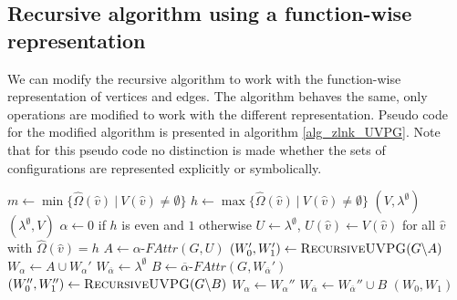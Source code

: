 \subsection{Recursive algorithm using a function-wise representation}
We can modify the recursive algorithm to work with the function-wise representation of vertices and edges. The algorithm behaves the same, only operations are modified to work with the different representation.  Pseudo code for the modified algorithm is presented in algorithm \ref{alg_zlnk_UVPG}. Note that for this pseudo code no distinction is made whether the sets of configurations are represented explicitly or symbolically.
\begin{algorithm}
	\caption{$\textsc{RecursiveUVPG}(\textit{PG } G = (\\
		V : \hat{V} \rightarrow 2^\mathfrak{C},\\
		\hat{V}_0 \subseteq \hat{V},\\
		\hat{V}_1 \subseteq \hat{V},\\
		E : \hat{E} \rightarrow 2^\mathfrak{C},\\
		\hat{\Omega} : \hat{V}\rightarrow \mathbb{N}))$}\label{alg_zlnk_UVPG}
	\begin{algorithmic}[1]
		\State $m \gets \min\{ \hat{\Omega}(\hat{v})\ |\ V(\hat{v}) \neq \emptyset \}$
		\State $h \gets \max\{ \hat{\Omega}(\hat{v})\ |\ V(\hat{v}) \neq \emptyset \}$
		\State \Return $(V,\lambda^\emptyset)$
		\Else
		\State \Return $(\lambda^\emptyset, V)$
		\EndIf
		\EndIf
		\State $\alpha \gets 0$ if $h$ is even and $1$ otherwise
		\State $U \gets \lambda^\emptyset$, $U(\hat{v}) \gets V(\hat{v})$ for all $\hat{v}$ with $\hat{\Omega}(\hat{v}) = h$
		\State $A \gets \alpha\textit{-FAttr}(G, U)$
		\State $(W_0', W_1') \gets \textsc{RecursiveUVPG}(G \backslash A)$
		\State $W_\alpha \gets A \cup W_\alpha'$
		\State $W_{\overline{\alpha}} \gets \lambda^\emptyset$
		\Else
		\State $B \gets \overline{\alpha}\textit{-FAttr}(G,W_{\overline{\alpha}}')$
		\State $(W_0'', W_1'') \gets \textsc{RecursiveUVPG}(G \backslash B)$
		\State $W_\alpha \gets W_\alpha''$
		\State $W_{\overline{\alpha}} \gets W_{\overline{\alpha}}'' \cup B$
		\EndIf
		\State \Return $(W_0, W_1)$
	\end{algorithmic}
\end{algorithm}

